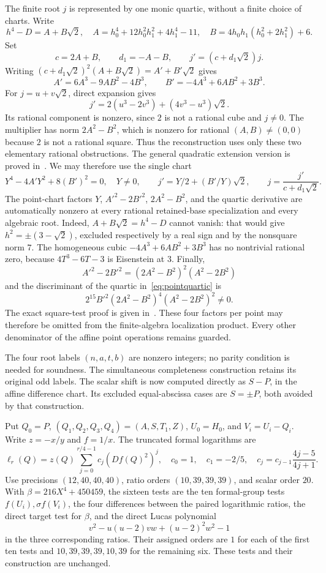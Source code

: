 \documentclass[11pt,a4paper]{article}
\begin{document}
The finite root $j$ is represented by one monic quartic,
without a finite choice of charts. Write
\[
 h^4-D=A+B\sqrt2,
 \quad A=h_0^4+12h_0^2h_1^2+4h_1^4-11,
 \quad B=4h_0h_1(h_0^2+2h_1^2)+6.
\]
Set
\[
 c=2A+B,\qquad d_1=-A-B,\qquad j'=(c+d_1\sqrt2)j.
\]
Writing $(c+d_1\sqrt2)^2(A+B\sqrt2)=A'+B'\sqrt2$ gives
\[
 A'=6A^3-9AB^2-4B^3,\qquad
 B'=-4A^3+6AB^2+3B^3.
\]
For $j=u+v\sqrt2$, direct expansion gives
\[
 j'=2(u^3-2v^3)+(4v^3-u^3)\sqrt2.
\]
Its rational component is nonzero, since $2$ is not a rational
cube and $j\ne0$. The multiplier has norm $2A^2-B^2$,
which is nonzero for rational $(A,B)\ne(0,0)$ because $2$
is not a rational square. Thus the reconstruction uses only
these two elementary rational obstructions. The general quadratic
extension version is proved in~\cite{QuadraticCharts}.
We may therefore use the single chart
\begin{equation}\label{eq:pointquartic}
 Y^4-4A'Y^2+8(B')^2=0,\quad Y\ne0,\qquad
 j'=Y/2+(B'/Y)\sqrt2,\qquad
 j=\frac{j'}{c+d_1\sqrt2}.
\end{equation}
The point-chart factors $Y$, $A'^2-2B'^2$, $2A^2-B^2$,
and the quartic derivative are automatically nonzero at every
rational retained-base specialization and every algebraic root.
Indeed, $A+B\sqrt2=h^4-D$ cannot vanish: that would give
$h^2=\pm(3-\sqrt2)$, excluded respectively by a real sign
and by the nonsquare norm $7$. The homogeneous cubic
$-4A^3+6AB^2+3B^3$ has no nontrivial rational zero, because
$4T^3-6T-3$ is Eisenstein at $3$. Finally,
\[
 A'^2-2B'^2=(2A^2-B^2)^2(A^2-2B^2)
\]
and the discriminant of the quartic in~\eqref{eq:pointquartic} is
\[
                 2^{15}B'^2(2A^2-B^2)^4(A^2-2B^2)^2\ne0.
\]
The exact square-test proof is given in~\cite{SquarePredicate}.
These four factors per point may therefore be omitted from the
finite-algebra localization product. Every other denominator of the
affine point operations remains guarded.

The four root labels $(n,a,t,b)$ are nonzero integers; no parity
condition is needed for soundness. The simultaneous completeness
construction retains its original odd labels. The scalar shift
is now computed directly as $S-P$, in the affine difference
chart. Its excluded equal-abscissa cases are $S=\pm P$, both
avoided by that construction.

Put $Q_0=P$, $(Q_1,Q_2,Q_3,Q_4)=(A,S,T_1,Z)$,
$U_0=H_0$, and $V_i=U_i-Q_i$. Write $z=-x/y$ and $f=1/x$.
The truncated formal logarithms are
\[
 \ell_r(Q)=z(Q)\sum_{j=0}^{r/4-1}c_j(Df(Q)^2)^j,
 \quad c_0=1,\quad c_1=-2/5,\quad
 c_j=c_{j-1}\frac{4j-5}{4j+1}.
\]
Use precisions $(12,40,40,40)$, ratio orders $(10,39,39,39)$,
and scalar order $20$. With
$\beta=216X^4+450459$, the sixteen tests are the ten
formal-group tests $f(U_i),\sigma f(V_i)$, the four differences
between the paired logarithmic ratios, the direct target test
for $\beta$, and the direct Lucas polynomial
\[
 v^2-u(u-2)vw+(u-2)^2w^2-1
\]
in the three corresponding ratios. Their assigned orders are
$1$ for each of the first ten tests and
$10,39,39,39,10,39$ for the remaining six. These tests and
their construction are unchanged.
\end{document}
